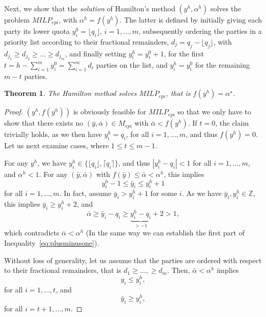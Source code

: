 \documentclass[12pt]{article}
\newcommand{\Z}{\mathbb{Z}}
\newtheorem{theorem}[definition]{Theorem}
\begin{document}
Next, we show that the \emph{solution} of Hamilton's method $(y^h,\alpha^h)$ solves the problem $MILP_{epi}$, with $\alpha^h = f(y^h)$. The latter is defined by initially giving each party its lower quota $y^{0}_i = \lfloor q_i \rfloor$, $i=1, \dots, m$, subsequently ordering the parties in a priority list according to their fractional remainders, $d_j = q_j - \lfloor q_j \rfloor$, with $d_{j_1} \geq d_{j_2}\geq \dots \geq d_{j_m}$, and finally setting $y^h_i = y_i^0 + 1$, for the first $t = h-\sum_{i=1}^m y^0_i = \sum_{i=1}^m d_i$ parties on the list, and $y^h_i = y^0_i$ for the remaining $m-t$ parties.
\begin{theorem}
The Hamilton method solves $MILP_{epi}$, that is $f(y^h) = \alpha^\star$.
\end{theorem}
\begin{proof}
$(y^h,f(y^h))$ is obviously feasible for $MILP_{epi}$ so that we only have to show that there exists no $(\bar y, \bar \alpha) \in M_{epi}$ with $\bar \alpha < f(y^h)$. If $t=0$, the claim trivially holds, as we then have $y_i^h = q_i$, for all $i=1,\dots,m$, and thus $f(y^h)=0$. Let us next examine cases, where $1 \leq t \leq m-1$.

For any $y^h$, we have $y^h_i \in \{\lfloor q_i\rfloor, \lceil q_i\rceil\}$, and thus $|y^h_i - q_i| < 1$ for all $i=1,\dots,m$, and  $\alpha^h <1$. For any $(\bar y,\bar \alpha)$ with $f(\bar y)\leq\bar{\alpha}< \alpha^h$, this implies \begin{equation}\label{eq:plusminusone} y^h_i -1 \leq \bar y_i \leq y^h_i+1\end{equation} for all $i=1,\dots,m$. In fact, assume $\bar y_i > y_i^h + 1$ for some $i$. As we have $\bar y_i, y_i^h \in \Z$, this implies $\bar y_i \geq y_i^h+2$, and \[\bar \alpha \geq \bar y_i - q_i \geq \underbrace{y_i^h - q_i}_{>-1} +2 > 1, \]
which contradicts $\bar{\alpha}< \alpha^h$ (In the same way we can establish the first part of Inequality~\eqref{eq:plusminusone}).

Without loss of generality, let us assume that the parties are ordered with respect to their fractional remainders, that is $d_1 \geq \dots, \geq d_m$. Then, $\bar \alpha < \alpha^h$ implies 
\begin{equation} \label{eq:geq}
y_i \leq y^h_i,
\end{equation}  for all $i=1,\dots,t$, and \begin{equation}\label{eq:leq} \bar y_i\geq y_i^h, \end{equation} for all $i=t+1,\dots, m$.


\end{proof}
\end{document}
